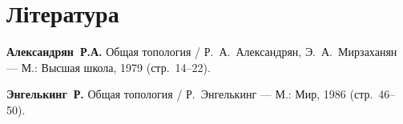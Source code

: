 \section{Література}

\begin{enumerate}[label={[\arabic*]}]
\item \textbf{Александрян~Р.А.}
Общая топология /
Р.~А.~Александрян, Э.~А.~Мирзаханян ---
М.: Высшая школа, 1979 (стр.~14--22).
\item \textbf{Энгелькинг~Р.}
Общая топология /
Р.~Энгелькинг ---
М.: Мир, 1986 (стр.~46--50).
\end{enumerate}